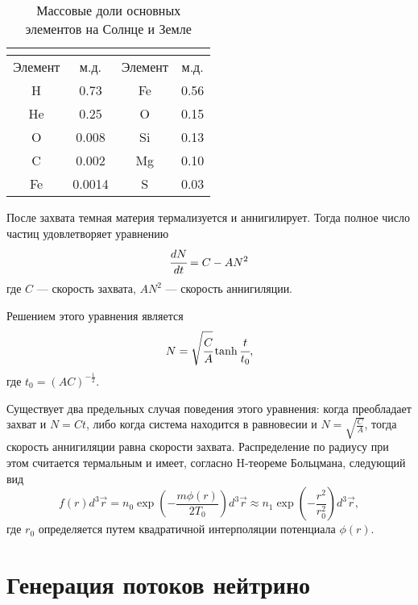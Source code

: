 \begin{table}[h!]
	\centering
	\begin{tabular}{|c|c||c|c|}
		\hline
		\multicolumn{2}{|c||}{\text{Солнце}} & \multicolumn{2}{c|}{\text{Земля}}\\
		\hline
		Элемент & м.д. & Элемент & м.д.\\ 
		\hline
		H &	0.73 & Fe & 0.56\\ 
		\hline
		He & 0.25 & O & 0.15\\
		\hline
		O &	0.008 & Si & 0.13\\
		\hline
		C &	0.002 & Mg & 0.10\\
		\hline
		Fe & 0.0014 & S & 0.03\\
		\hline
	\end{tabular}
	\caption{Массовые доли основных элементов на Солнце и Земле}
	\label{tab:mass_fractions}
\end{table}

После захвата темная материя термализуется и аннигилирует. Тогда полное число частиц удовлетворяет уравнению
\begin{equation}
	\label{eq:evolve_big}
	\cfrac{d N}{d t} = C - A N^2
\end{equation}
где $C$ --- скорость захвата, $AN^2$ --- скорость аннигиляции.

Решением этого уравнения является
\begin{equation}
	N = \sqrt{\cfrac{C}{A}}\tanh{\cfrac{t}{t_0}},
\end{equation}
где $t_{0} = (AC)^{-\frac{1}{2}}$.

Существует два предельных случая поведения этого уравнения: когда преобладает захват и $N = Ct$, либо когда система находится в равновесии и $N = \sqrt{\frac{C}{A}}$, тогда скорость аннигиляции равна скорости захвата.
Распределение по радиусу при этом считается термальным и имеет, согласно H-теореме Больцмана, следующий вид
\begin{equation}
	\label{eq:therm_dens}
	f(r) d^3\vec{r} = n_0\exp(-\frac{m\phi(r)}{2T_0})d^3\vec{r} \approx
	 n_1\exp(-\frac{r^2}{r_0^2})d^3\vec{r},
\end{equation}
где $r_0$ определяется путем квадратичной интерполяции потенциала $\phi(r)$.



\section{Генерация потоков нейтрино}

